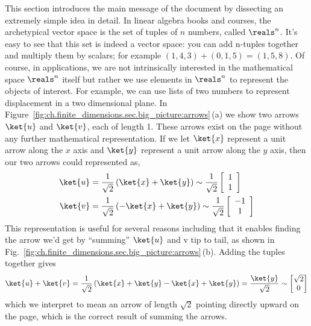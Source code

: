
This section introduces the main message of the document by dissecting an extremely simple idea in detail.
In linear algebra books and courses, the archetypical vector space is the set of tuples of $n$ numbers, called $\reals^n$.
It's easy to see that this set is indeed a vector space: you can add n-tuples together and multiply them by scalars; for example $(1,4,3) + (0,1,5) = (1,5,8)$.
Of course, in applications, we are not intrinsically interested in the mathematical space $\reals^n$ itself but rather we use elements in $\reals^n$ to represent the objects of interest.
For example, we can use lists of two numbers to represent displacement in a two dimensional plane.
In Figure~\ref{fig:ch.finite_dimensions.sec.big_picture:arrows}\,(a) we show two arrows $\ket{u}$ and $\ket{v}$, each of length 1.
These arrows exist on the page without any further mathematical representation.
If we let $\ket{x}$ represent a unit arrow along the $x$ axis and $\ket{y}$ represent a unit arrow along the $y$ axis, then our two arrows could represented as,
\begin{align}
  \ket{u}
  &= \frac{1}{\sqrt{2}} \left( \ket{x} + \ket{y} \right) \sim \frac{1}{\sqrt{2}} \left[ \begin{array}{c} 1 \\ 1 \end{array} \right] \\
  \ket{v}
  &= \frac{1}{\sqrt{2}} \left( -\ket{x} + \ket{y}\right) \sim \frac{1}{\sqrt{2}} \left[ \begin{array}{c} -1 \\ 1 \end{array} \right]
\end{align}
This representation is useful for several reasons including that it enables finding the arrow we'd get by ``summing'' $\ket{u}$ and $\text{v}$ tip to tail, as shown in Fig.~\ref{fig:ch.finite_dimensions.sec.big_picture:arrows}\,(b).
Adding the tuples together gives
\begin{displaymath}
  \ket{u} + \ket{v} = \frac{1}{\sqrt{2}} \left( \ket{x} + \ket{y} - \ket{x} + \ket{y} \right) = \frac{\ket{y}}{\sqrt{2}}
  \sim
  \begin{bmatrix}
    \sqrt{2} \\
    0
  \end{bmatrix}
\end{displaymath}
which we interpret to mean an arrow of length $\sqrt{2}$ pointing directly upward on the page, which is the correct result of summing the arrows.

